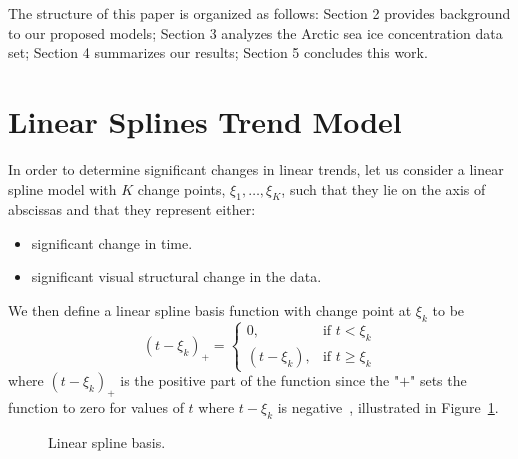 \documentclass[12pt]{article}
\begin{document}
The structure of this paper is organized as follows: Section 2 provides background to our proposed models; Section 3 analyzes the Arctic sea ice concentration data set; Section 4 summarizes our results; Section 5 concludes this work.


\section{Linear Splines Trend Model}

In order to determine significant changes in linear trends, let us consider a linear spline model with $K$ change points, $\xi_1,\dots,\xi_K$, such that they lie on the axis of abscissas and that they represent either:
  \begin{itemize}
    \item significant change in time.
    \item significant visual structural change in the data.
  \end{itemize}
We then define a linear spline basis function with change point at $\xi_k$ to be
  \begin{equation*}
    (t-\xi_{k})_{+} =
      \begin{cases}
      0,           & \text{if $t < \xi_{k}$} \\
      (t-\xi_{k}), & \text{if $t \geq \xi_{k}$}
      \end{cases}
  \end{equation*}
where $(t-\xi_k)_{+}$ is the positive part of the function since the "$+$" sets the function to zero for values of $t$ where $t-\xi_{k}$ is negative~\citep{ruppert}, illustrated in Figure~\ref{spline}. 
\begin{figure}[!h]
  \centering
  \caption{Linear spline basis.} \label{spline}
\end{figure}
\end{document}
